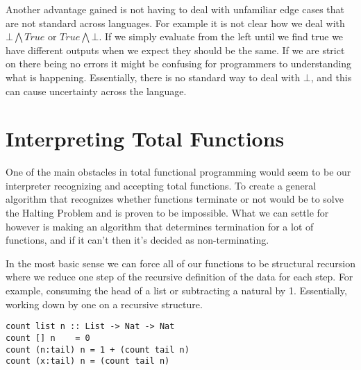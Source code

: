 \documentclass[12pt]{article}
\begin{document}
Another advantage gained is not having to deal with unfamiliar edge cases that are not standard across languages. For example it is not clear how we deal with $\bot \bigwedge True$ or $True \bigwedge \bot$. If we simply evaluate from the left until we find true we have different outputs when we expect they should be the same. If we are strict on there being no errors it might be confusing for programmers to understanding what is happening. Essentially, there is no standard way to deal with $\bot$, and this can cause uncertainty across the language.

\section{Interpreting Total Functions}

One of the main obstacles in total functional programming would seem to be our interpreter recognizing and accepting total functions. To create a general algorithm that recognizes whether functions terminate or not would be to solve the Halting Problem and is proven to be impossible. What we can settle for however is making an algorithm that determines termination for a lot of functions, and if it can't then it's decided as non-terminating.

In the most basic sense we can force all of our functions to be structural recursion where we reduce one step of the recursive definition of the data for each step. For example, consuming the head of a list or subtracting a natural by 1. Essentially, working down by one on a recursive structure.

\bigskip
\begin{lstlisting}[frame=single,mathescape=true]
count list n :: List -> Nat -> Nat
count [] n    = 0
count (n:tail) n = 1 + (count tail n)
count (x:tail) n = (count tail n)
\end{lstlisting}
\end{document}
